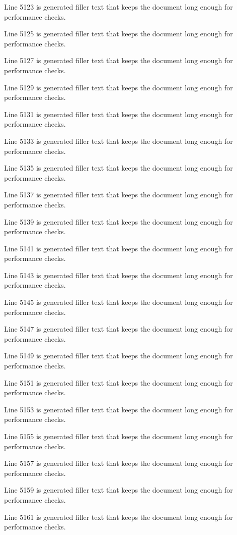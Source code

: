 Line 5123 is generated filler text that keeps the document long enough for performance checks.

Line 5125 is generated filler text that keeps the document long enough for performance checks.

Line 5127 is generated filler text that keeps the document long enough for performance checks.

Line 5129 is generated filler text that keeps the document long enough for performance checks.

Line 5131 is generated filler text that keeps the document long enough for performance checks.

Line 5133 is generated filler text that keeps the document long enough for performance checks.

Line 5135 is generated filler text that keeps the document long enough for performance checks.

Line 5137 is generated filler text that keeps the document long enough for performance checks.

Line 5139 is generated filler text that keeps the document long enough for performance checks.

Line 5141 is generated filler text that keeps the document long enough for performance checks.

Line 5143 is generated filler text that keeps the document long enough for performance checks.

Line 5145 is generated filler text that keeps the document long enough for performance checks.

Line 5147 is generated filler text that keeps the document long enough for performance checks.

Line 5149 is generated filler text that keeps the document long enough for performance checks.

Line 5151 is generated filler text that keeps the document long enough for performance checks.

Line 5153 is generated filler text that keeps the document long enough for performance checks.

Line 5155 is generated filler text that keeps the document long enough for performance checks.

Line 5157 is generated filler text that keeps the document long enough for performance checks.

Line 5159 is generated filler text that keeps the document long enough for performance checks.

Line 5161 is generated filler text that keeps the document long enough for performance checks.

